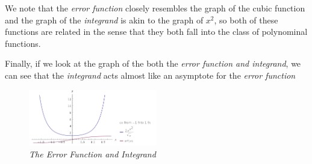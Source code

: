 \documentclass[12pt, executivepaper]{article}
\begin{document}
\begin{flushleft}
\begin{figure}[H]
\end{figure}

We note that the \textit{error function} closely resembles the graph of the cubic function and the graph of the \textit{integrand} is akin to the graph of $x^2$, so both of these functions are related in the sense that they both fall into the class of polynominal functions.

\vspace{3mm}

Finally, if we look at the graph of the both the \textit{error function and integrand}, we can see that the \textit{integrand} acts almost like an asymptote for the \textit{error function}

\begin{figure}[H]

\centering

\includegraphics[width=0.5\textwidth]{BothGraphs}

\caption{\textit{The Error Function and Integrand}}

\end{figure}

\end{flushleft}

\pagebreak

\vspace*{-40mm}
\end{document}
